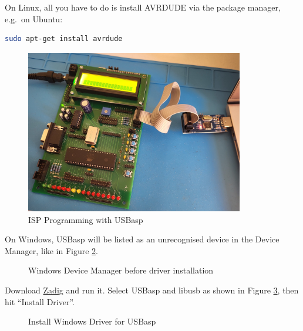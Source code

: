 \documentclass{article}
\begin{document}
On Linux, all you have to do is install AVRDUDE via the package manager, e.g.\ on Ubuntu:
\begin{lstlisting}[language=bash]
sudo apt-get install avrdude
\end{lstlisting}

\begin{figure}[htb]
\centering
\includegraphics[width=0.85\textwidth]{Pictures/UsbAspProg.jpg}
\caption{ISP Programming with USBasp}
\label{fig:usbAspProg}
\end{figure}

On Windows, USBasp will be listed as an unrecognised device in the Device Manager, like in Figure \ref{fig:deviceManagerBefore}. 
\begin{figure}[htb]
\centering
{}
\caption{Windows Device Manager before driver installation}
\label{fig:deviceManagerBefore}
\end{figure}

Download \href{https://zadig.akeo.ie/}{Zadig} and run it. Select USBasp and libusb as shown in Figure \ref{fig:driverUSBasp}, then hit ``Install Driver''. 
\begin{figure}[htb]
\centering
{}
\caption{Install Windows Driver for USBasp}
\label{fig:driverUSBasp}
\end{figure}
\end{document}
